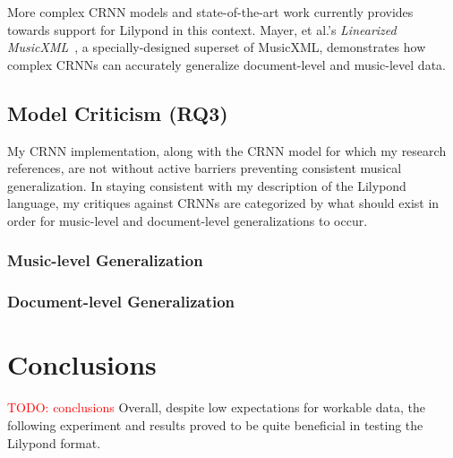 \documentclass[sigconf]{acmart}
\newcommand{\todo}[1]{\textcolor{red}{TODO: #1}}
\begin{document}
More complex CRNN models and state-of-the-art work currently provides towards support for Lilypond in this context.
Mayer, et al.'s \textit{Linearized MusicXML}~\cite{mayer2024practical}, a specially-designed superset of MusicXML, demonstrates how complex CRNNs can accurately generalize document-level and music-level data.


\subsection{Model Criticism (RQ3)}
My CRNN implementation, along with the CRNN model for which my research references, are not without active barriers preventing consistent musical generalization.
In staying consistent with my description of the Lilypond language, my critiques against CRNNs are categorized by what should exist in order for music-level and document-level generalizations to occur.

\subsubsection{Music-level Generalization}


\subsubsection{Document-level Generalization}

\section{Conclusions}
\todo{conclusions}
Overall, despite low expectations for workable data, the following experiment and results proved to be quite beneficial in testing the Lilypond format.



\end{document}

